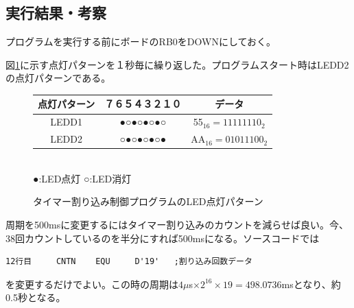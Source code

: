 \documentclass[a4paper,12pt]{ujarticle}
\begin{document}
  \subsection{実行結果・考察}
  プログラムを実行する前にボードのRB0をDOWNにしておく。

  図\ref{fig:timer-int-led}に示す点灯パターンを１秒毎に繰り返した。プログラムスタート時はLEDD2の点灯パターンである。

  \begin{figure}
    \begin{center}
       \begin{tabular}{c|c|c}\hline
点灯パターン&７６５４３２１０ & データ \\ \hline
      LEDD1 &●○●○●○●○ & 55$_{16}=11111110_2$ \\
      LEDD2 &○●○●○●○● & AA$_{16}=01011100_2$\\ \hline
       \end{tabular}\\
      ●:LED点灯 ○:LED消灯
    \end{center}
   \caption{タイマー割り込み制御プログラムのLED点灯パターン}
   \label{fig:timer-int-led}
  \end{figure}


  周期を500msに変更するにはタイマー割り込みのカウントを減らせば良い。今、38回カウントしているのを半分にすれば500msになる。ソースコードでは
      \begin{lstlisting}[basicstyle=\ttfamily\footnotesize, frame=single]
12行目     CNTN    EQU     D'19'   ;割り込み回数データ
      \end{lstlisting}
      を変更するだけでよい。この時の周期は$4\mu$s$\times 2^{16}\times 19=498.0736$msとなり、約0.5秒となる。
\end{document}

